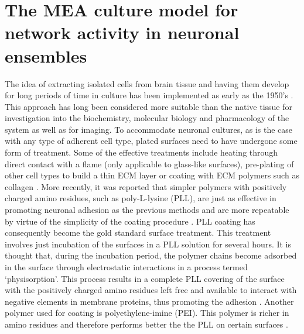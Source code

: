 	\section{The MEA culture model for network activity in neuronal ensembles}
    \label{sec:introduction:MEANetwork}
    The idea of extracting isolated cells from brain tissue and having them develop for long periods of time in culture has been implemented as early as the 1950's \cite{nelson1975nerve}. This approach has long been considered more suitable than the native tissue for investigation into the biochemistry, molecular biology and pharmacology of the system as well as for imaging. To accommodate neuronal cultures, as is the case with any type of adherent cell type, plated surfaces need to have undergone some form of treatment. Some of the effective treatments include heating through direct contact with a flame (only applicable to glass-like surfaces), pre-plating of other cell types to build a thin ECM layer or coating with ECM polymers such as collagen \cite{dichter1978rat}. More recently, it was reported that simpler polymers with positively charged amino residues, such as poly-L-lysine (PLL), are just as effective in promoting neuronal adhesion as the previous methods and are more repeatable by virtue of the simplicity of the coating procedure \cite{mazia1975adhesion}. PLL coating has consequently become the gold standard surface treatment. This treatment involves just incubation of the surfaces in a PLL solution for several hours. It is thought that, during the incubation period, the polymer chains become adsorbed in the surface through electrostatic interactions in a process termed `physisorption'. This process results in a complete PLL covering of the surface with the positively charged amino residues left free and available to interact with negative elements in membrane proteins, thus promoting the adhesion \cite{mazia1975adhesion}. Another polymer used for coating is polyethylene-imine (PEI). This polymer is richer in amino residues and therefore performs better the the PLL on certain surfaces \cite{wiertz2010regulation}.

